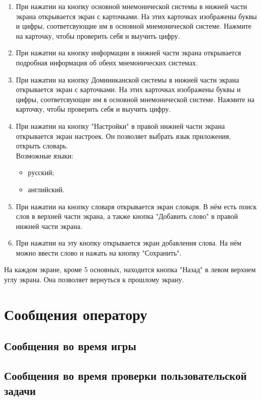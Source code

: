 \documentclass[draft]{article}
\begin{document}
\begin{enumerate}
\item При нажатии на кнопку основной мнемонической системы в нижней части экрана открывается экран с карточками. На этих карточках изображены буквы и цифры, соответсвующие им в основной мнемонической системе. Нажмите на карточку, чтобы проверить себя и выучить цифру.
\item При нажатии на кнопку информации в нижней части экрана открывается подробная информация об обеих мнемонических системах.
\item При нажатии на кнопку Доминиканской системы в нижней части экрана открывается экран с карточками. На этих карточках изображены буквы и цифры, соответсвующие им в основной мнемонической системе. Нажмите на карточку, чтобы проверить себя и выучить цифру.
\item При нажатии на кнопку "{}Настройки"{} в правой нижней части экрана открывается экран настроек. Он позволяет выбрать язык приложения, открыть словарь.\\
Возможные языки:
\begin{itemize}
\item русский;
\item английский.
\end{itemize}
\item При нажатии на кнопку словаря открывается экран словаря. В нём есть поиск слов в верхней части экрана, а также кнопка "{}Добавить слово"{} в правой нижней части экрана. 
\item При нажатии на эту кнопку открывается экран добавления слова. На нём можно ввести слово и нажать на кнопку "{}Сохранить"{}.
\end{enumerate}
На каждом экране, кроме 5 основных, находится кнопка "{}Назад"{} в левом верхнем углу экрана. Она позволяет вернуться к прошлому экрану.
\newpage
\section{Сообщения оператору}
\subsection{Сообщения во время игры}
\subsection{Сообщения во время проверки пользовательской задачи}
\newpage
{}
\end{document}
